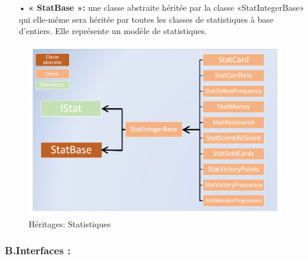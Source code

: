 \documentclass[13pt ,a4paper ]{report}
\begin{document}
\begin{multicols}{2}
	
 	\begin{itemize}
	 	\item[•]\textbf{« StatBase »:} une classe abstraite héritée par la classe «StatIntegerBase» qui elle-même sera héritée par toutes les classes de statistiques à base d’entiers. Elle représente un modèle de statistiques. 
	 	
    \end{itemize} 
		\begin{figure}[H]
      	\begin{center}
			\includegraphics[scale=0.24]{stat.png}
			\caption{Héritages: Statistiques}
		\end{center}
		\end{figure}
	
		\subsubsection{B.\hspace*{0.5cm}Interfaces  :}

\end{multicols}
\end{document}
